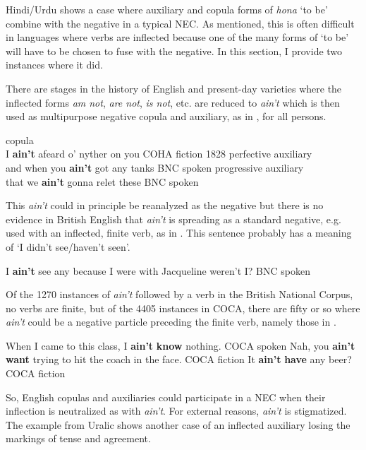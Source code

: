 \documentclass[output=paper,draft,draftmode,colorlinks,citecolor=brown]{langscibook}
\begin{document}
Hindi\slash Urdu shows a case where auxiliary and copula forms of
\textit{hona} `to be' combine with the negative in a typical NEC. As
mentioned, this is often difficult in languages where verbs are inflected
because one of the many forms of `to be' will have to be chosen to fuse
with the negative. In this section, I provide two instances where it did.

There are stages in the history of English and present-day varieties where
the inflected forms \textit{am not}, \textit{are not},
\textit{is not}, etc. are reduced to \textit{ain't} which is then
used as multipurpose negative copula and auxiliary, as in
, for all persons.
%
\begin{exe}\ex\label{ex:other-english-aint-stages}\begin{xlist}
    \ex copula\\
    I \textbf{ain't} afeard o' nyther on you {\ob}COHA fiction 1828{\cb}
    \jambox{}
    \ex perfective auxiliary\\
    and when you \textbf{ain't} got any tanks {\ob}BNC spoken{\cb}
    \jambox{}
    \ex progressive auxiliary \\
    that we \textbf{ain't} gonna relet these {\ob}BNC spoken{\cb}
    \jambox{}
    \end{xlist}\end{exe}
%
This \textit{ain't} could in principle be reanalyzed as the negative but
there is no evidence in British English that \textit{ain't} is spreading as
a standard negative, e.g. used with an inflected, finite verb, as in
. This sentence probably has a
meaning of `I didn't see\slash haven't seen'.
%
\begin{exe}\ex
    \label{ex:other-english-aint-Jacqueline}
      I \textbf{ain't} see any because I were with Jacqueline weren't
          I? {\ob}BNC spoken{\cb}
    \end{exe}
%
Of the 1270 instances of \textit{ain't} followed by a verb in the British
National Corpus, no verbs are finite, but of the 4405 instances in COCA,
there are fifty or so where \textit{ain't} could be a negative particle
preceding the finite verb, namely those in .
%
\begin{exe}\ex\label{ex:other-english-aint-coca}\begin{xlist}
    \ex When I came to this class, I \textbf{ain't} \textbf{know} nothing. {\ob}COCA spoken{\cb}
    \ex Nah, you \textbf{ain't want} trying to hit the coach in the face. {\ob}COCA fiction{\cb}
    \ex It \textbf{ain't} \textbf{have} any beer? {\ob}COCA fiction{\cb}
    \end{xlist}\end{exe}
%
So, English copulas and auxiliaries could participate in a
NEC when their inflection is neutralized as with \textit{ain't}. For
external reasons, \textit{ain't}  is stigmatized. The example from
Uralic shows another case of an inflected auxiliary losing the
markings of tense and agreement.
\end{document}
